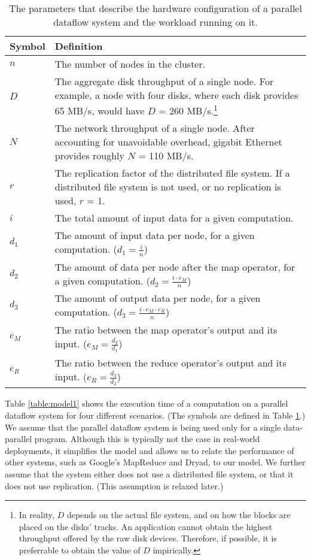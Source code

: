 \documentclass{acm_proc_article-sp}
\begin{document}
\begin{table}
\centering
\begin{minipage}{0.5\textwidth}
\centering
\renewcommand{\arraystretch}{1.2}
\begin{tabular}{|l|p{6.5cm}|}
\hline
Symbol & Definition \\ \hline
$n$    & The number of nodes in the cluster. \\ \hline
$D$    & The aggregate disk throughput of a single node. For example,
a node with four disks, where each disk provides 65 MB/s, would have $D$ = 260
MB/s.\footnote{In reality, $D$ depends on the actual file system, and on
how the blocks are placed on the disks' tracks. An application cannot obtain
the highest throughput offered by the raw disk devices. Therefore, if possible,
it is preferrable to obtain the value of $D$ impirically.} \\ \hline
$N$    & The network throughput of a single node. After accounting for unavoidable overhead, gigabit Ethernet provides roughly $N$ = 110 MB/s. \\ \hline
$r$    & The replication factor of the distributed file system. If a
distributed file system is not used, or no replication is used, $r$ = 1. \\
\hline
$i$    & The total amount of input data for a given computation. \\ \hline
$d_1$  & The amount of input data per node, for a given computation. ($d_1 =
\frac{i}{n}$) \\ \hline
$d_2$  & The amount of data per node after the map operator, for a given
computation. ($d_2 = \frac{i \cdot e_M}{n}$) \\ \hline
$d_3$  & The amount of output data per node, for a given computation. ($d_3 =
\frac{i \cdot e_M \cdot e_R}{n}$) \\ \hline
$e_M$  & The ratio between the map operator's output and its input. ($e_M =
\frac{d_2}{d_1}$) \\ \hline $e_R$  & The ratio between the
reduce operator's output and its input. ($e_R = \frac{d_3}{d_2}$) \\ \hline

\end{tabular}
\caption{The parameters that describe the hardware configuration of a parallel dataflow system and the workload running on it.}
\label{table:symbols}
\end{minipage}
\end{table}

Table \ref{table:model1} shows the execution time of a computation on a
parallel dataflow system for four different scenarios. (The symbols are defined
in Table \ref{table:symbols}.) We assume that the parallel dataflow system is
being used only for a single data-parallel program. Although this is typically
not the case in real-world deployments, it simplifies the model and allows us
to relate the performance of other systems, such as Google's MapReduce and
Dryad, to our model. We further assume that the system either does not
use a distributed file system, or that it does not use replication. (This
assumption is relaxed later.)
\end{document}
